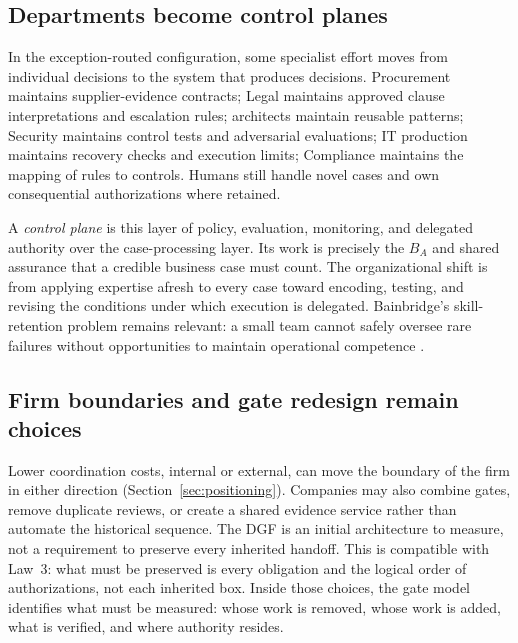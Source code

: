 \subsection{Departments become control planes}

In the exception-routed configuration, some specialist effort moves from individual decisions to
the system that produces decisions. Procurement maintains supplier-evidence contracts; Legal
maintains approved clause interpretations and escalation rules; architects maintain reusable
patterns; Security maintains control tests and adversarial evaluations; IT production maintains recovery checks and execution limits; Compliance maintains the mapping of
rules to controls. Humans still handle novel cases and own consequential authorizations
where retained.

A \emph{control plane} is this layer of policy, evaluation, monitoring, and delegated authority over
the case-processing layer. Its work is precisely the $B_A$ and shared assurance that a credible
business case must count. The organizational shift is from applying expertise afresh to every case
toward encoding, testing, and revising the conditions under which execution is delegated.
Bainbridge's skill-retention problem remains relevant: a small team cannot safely oversee rare
failures without opportunities to maintain operational competence \citep{bainbridge1983}.

\subsection{Firm boundaries and gate redesign remain choices}

Lower coordination costs, internal or external, can move the boundary of the firm in either direction
(Section~\ref{sec:positioning}). Companies may also combine gates, remove duplicate reviews, or create
a shared evidence service rather than automate the historical sequence. The DGF is an initial
architecture to measure, not a requirement to preserve every inherited handoff. This is compatible with
Law~3: what must be preserved is every obligation and the logical order of authorizations, not each
inherited box. Inside those choices,
the gate model identifies what must be measured: whose work is removed, whose work is added, what is
verified, and where authority resides.
